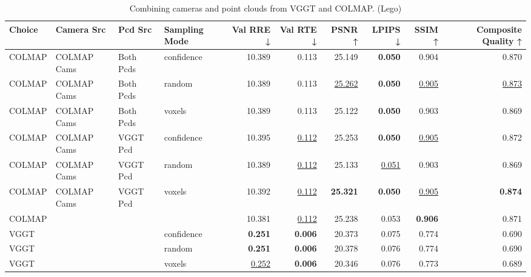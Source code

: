 \begin{table}[H]
\caption{Combining cameras and point clouds from VGGT and COLMAP. (Lego)}
\label{tab:07_combined_single_lego}
\centering
\scriptsize
\begin{tabular}{llllrrrrrr}
\toprule
Choice & Camera Src & Pcd Src & Sampling Mode & Val RRE ↓ & Val RTE ↓ & PSNR ↑ & LPIPS ↓ & SSIM ↑ & Composite Quality ↑ \\
\midrule
COLMAP & COLMAP Cams & Both Pcds & confidence & 10.389 & 0.113 & 25.149 & \textbf{0.050} & 0.904 & 0.870 \\
COLMAP & COLMAP Cams & Both Pcds & random & 10.389 & 0.113 & \underline{25.262} & \textbf{0.050} & \underline{0.905} & \underline{0.873} \\
COLMAP & COLMAP Cams & Both Pcds & voxels & 10.389 & 0.113 & 25.122 & \textbf{0.050} & 0.903 & 0.869 \\
COLMAP & COLMAP Cams & VGGT Pcd & confidence & 10.395 & \underline{0.112} & 25.253 & \textbf{0.050} & \underline{0.905} & 0.872 \\
COLMAP & COLMAP Cams & VGGT Pcd & random & 10.389 & \underline{0.112} & 25.133 & \underline{0.051} & 0.903 & 0.869 \\
COLMAP & COLMAP Cams & VGGT Pcd & voxels & 10.392 & \underline{0.112} & \textbf{25.321} & \textbf{0.050} & \underline{0.905} & \textbf{0.874} \\
COLMAP &  &  &  & 10.381 & \underline{0.112} & 25.238 & 0.053 & \textbf{0.906} & 0.871 \\
VGGT &  &  & confidence & \textbf{0.251} & \textbf{0.006} & 20.373 & 0.075 & 0.774 & 0.690 \\
VGGT &  &  & random & \textbf{0.251} & \textbf{0.006} & 20.378 & 0.076 & 0.774 & 0.690 \\
VGGT &  &  & voxels & \underline{0.252} & \textbf{0.006} & 20.346 & 0.076 & 0.773 & 0.689 \\
\bottomrule
\end{tabular}
\end{table}